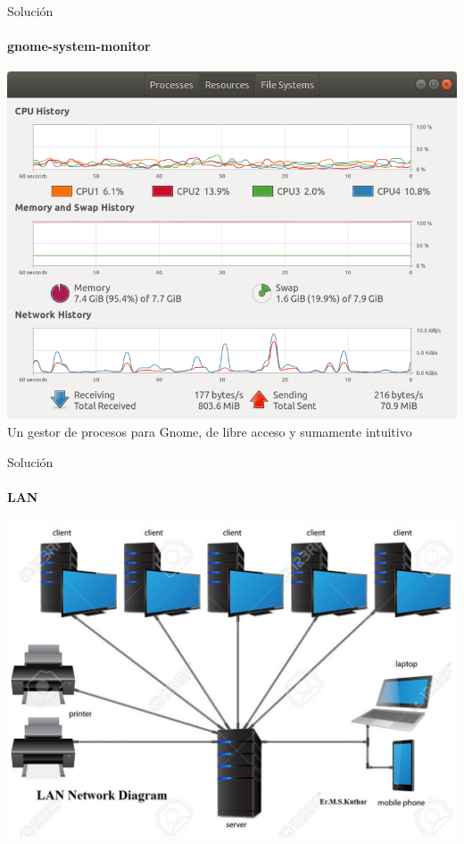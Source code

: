 \begin{frame}{Solución}
    \framesubtitle{gnome-system-monitor}
    \begin{center}
        \includegraphics[height=.6\textheight]{./pictures/gsm.png} \\
        Un gestor de procesos para Gnome, de libre acceso y
        sumamente intuitivo
    \end{center}
\end{frame}
\begin{frame}{Solución}
    \framesubtitle{LAN}
    \includegraphics[height=0.75\textheight]{./pictures/lan.jpg}
\end{frame}
